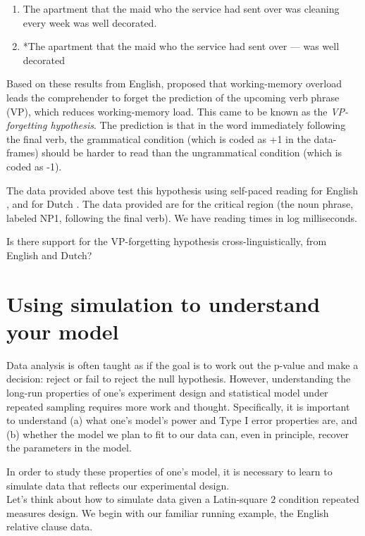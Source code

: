 \documentclass[12pt,]{krantz}
\begin{document}
\begin{enumerate}
\def\labelenumi{(\alph{enumi})}
\item
  The apartment that the maid who the service had sent over was cleaning every week was well decorated.
\item
  *The apartment that the maid who the service had sent over --- was well decorated
\end{enumerate}

Based on these results from English, \citet{gibsonthomas99} proposed that working-memory overload leads the comprehender to forget the prediction of the upcoming verb phrase (VP), which reduces working-memory load. This came to be known as the \emph{VP-forgetting hypothesis}. The prediction is that in the word immediately following the final verb, the grammatical condition (which is coded as +1 in the data-frames) should be harder to read than the ungrammatical condition (which is coded as -1).

The data provided above test this hypothesis using self-paced reading for English \citep{VSLK08}, and for Dutch \citep{FrankEtAl2015}. The data provided are for the critical region (the noun phrase, labeled NP1, following the final verb). We have reading times in log milliseconds.

Is there support for the VP-forgetting hypothesis cross-linguistically, from English and Dutch?

\hypertarget{using-simulation-to-understand-your-model}{%
\chapter{Using simulation to understand your model}\label{using-simulation-to-understand-your-model}}

Data analysis is often taught as if the goal is to work out the p-value and make a decision: reject or fail to reject the null hypothesis. However, understanding the long-run properties of one's experiment design and statistical model under repeated sampling requires more work and thought. Specifically, it is important to understand (a) what one's model's power and Type I error properties are, and (b) whether the model we plan to fit to our data can, even in principle, recover the parameters in the model.

In order to study these properties of one's model, it is necessary to learn to simulate data that reflects our experimental design.\\
Let's think about how to simulate data given a Latin-square \(2\) condition repeated measures design. We begin with our familiar running example, the \citet{grodner} English relative clause data.
\end{document}
